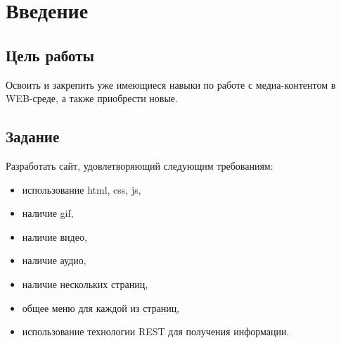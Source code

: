 \chapter{Введение}

\section{Цель работы}
Освоить и закрепить уже имеющиеся навыки по работе с медиа-контентом в WEB-среде, а также приобрести новые.

\section{Задание}
Разработать сайт, удовлетворяющий следующим требованиям:
\begin{itemize}
	\item использование html, css, js,
	\item наличие gif,
	\item наличие видео,
	\item наличие аудио,
	\item наличие нескольких страниц,
	\item общее меню для каждой из страниц,
	\item использование технологии REST для получения информации.
\end{itemize}